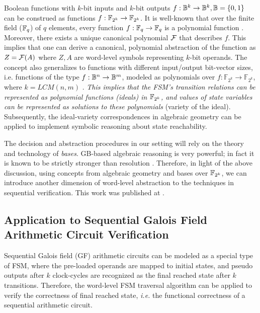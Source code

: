 Boolean functions with $k$-bit inputs and $k$-bit outputs 
$f: {\mathbb{B}}^k \rightarrow {\mathbb{B}}^k,{\mathbb{B}} = \{0, 1\}$ can be construed as functions
$f: {\mathbb{F}}_{2^k} \rightarrow {\mathbb{F}}_{2^k}$. It is well-known that over the finite
field (${\mathbb{F}}_{q}$) of  $q$ elements, every function $f: {\mathbb{F}}_{q}
\rightarrow {\mathbb{F}}_{q}$ is a polynomial function \cite{ff:1997}. Moreover,
there exists a unique canonical polynomial ${\mathcal{F}}$ that describes $f$.
This implies that one can derive a canonical, polynomial
  abstraction of the function as $Z = {\mathcal{F}}(A)$ where $Z, A$ are
word-level symbols representing $k$-bit operands. The concept also
generalizes to functions with different input/output bit-vector sizes,
i.e. functions of the type $f: {\mathbb{B}}^n \rightarrow {\mathbb{B}}^m$, modeled as
polynomials over $f:{\mathbb{F}}_{2^k} \rightarrow
{\mathbb{F}}_{2^k}$, where $k=LCM(n,m)$ \cite{ff:1997}.  
{\it This implies that the FSM's transition relations can be
represented as polynomial functions (ideals) in ${\mathbb{F}}_{2^k}$, and values of
state variables can be represented as solutions to these polynomials}
(variety of the ideal). Subsequently, the ideal-variety correspondences
in algebraic geometry can be applied to implement symbolic reasoning
about state reachability. 

The decision and abstraction procedures in our setting will rely on
the theory and technology of {\it \Grobner bases}. GB-based
algebraic reasoning is very powerful; in fact it is known to be
strictly stronger than resolution \cite{CEI:stoc-96}. Therefore, in
light of the above discussion, using concepts from algebraic geometry
and \Grobner bases over ${\mathbb{F}}_{2^k}$, we can introduce another dimension of
word-level abstraction to the techniques in sequential verification. 
This work was published at \cite{myHLDVT}.

\subsection{Application to Sequential Galois Field Arithmetic Circuit Verification}
Sequential Galois field (GF) arithmetic circuits can be modeled as a special type of 
FSM, where the pre-loaded operands are mapped to initial states, and pseudo outputs
after $k$ clock-cycles are recognized as the final reached state after $k$ transitions.
Therefore, the word-level FSM traversal algorithm can be applied to 
verify the correctness of final reached state, {\it i.e.} the functional correctness of
a sequential arithmetic circuit.

